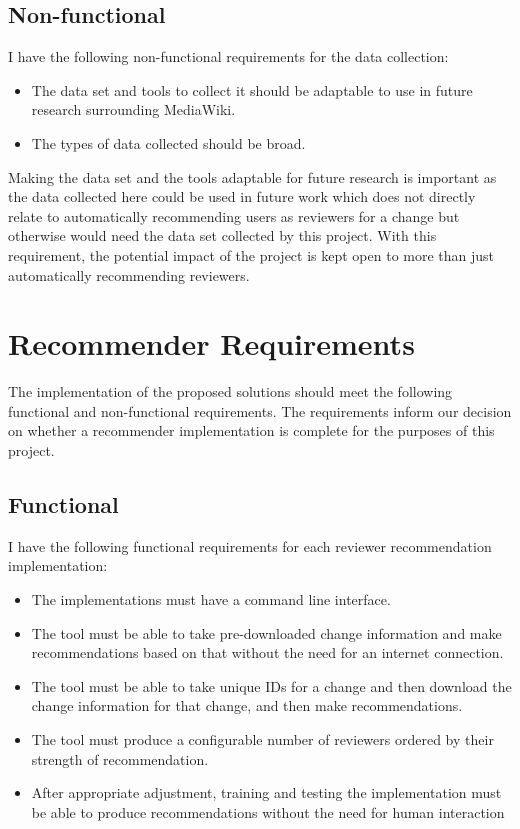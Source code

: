 \subsection{Non-functional}
I have the following non-functional requirements for the data collection:
\begin{itemize}
    \item The data set and tools to collect it should be adaptable to use in future research surrounding MediaWiki.
    \item The types of data collected should be broad.
\end{itemize}

Making the data set and the tools adaptable for future research is important as the data collected here could be used in future work which does not directly relate to automatically recommending users as reviewers for a change but otherwise would need the data set collected by this project. With this requirement, the potential impact of the project is kept open to more than just automatically recommending reviewers.

\section{Recommender Requirements\label{section:recommender-requirements}}
The implementation of the proposed solutions should meet the following functional and non-functional requirements. The requirements inform our decision on whether a recommender implementation is complete for the purposes of this project.

\subsection{Functional}
I have the following functional requirements for each reviewer recommendation implementation:
\begin{itemize}
    \item The implementations must have a command line interface.
    \item The tool must be able to take pre-downloaded change information and make recommendations based on that without the need for an internet connection.
    \item The tool must be able to take unique IDs for a change and then download the change information for that change, and then make recommendations.
    \item The tool must produce a configurable number of reviewers ordered by their strength of recommendation.
    \item After appropriate adjustment, training and testing the implementation must be able to produce recommendations without the need for human interaction
\end{itemize}

